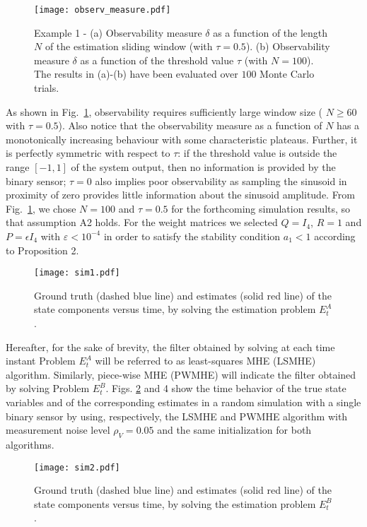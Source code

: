 \documentclass[11pt,journal,onecolumn]{IEEEtran}
\begin{document}
\begin{figure}[h!]
\centering
\texttt{[image: observ\_measure.pdf]}\caption{Example 1 - (a) Observability measure $\delta$ as a function of the length $N$ of the estimation sliding window (with $\tau = 0.5$). (b) Observability measure $\delta$ as a function of the threshold value $\tau$  (with $N = 100$). The results in (a)-(b) have been evaluated over $100$ Monte Carlo trials.}
\label{fig:observability_measure}
\end{figure}
As shown in Fig.~\ref{fig:observability_measure}, observability requires  sufficiently large window size ( $N \geq  60$ with $\tau = 0.5$).
Also notice that the observability measure as a function of $N$ has a monotonically increasing behaviour with some characteristic plateaus. Further, it is perfectly symmetric with respect to $\tau$: if the threshold value is outside the range $[-1,1]$ of the system output, then no information is provided by the binary sensor; $\tau = 0$ also implies poor observability as sampling the sinusoid in proximity of zero provides little information about the sinusoid amplitude. From Fig.~\ref{fig:observability_measure}, we chose $N = 100$ and $\tau = 0.5$ for the forthcoming simulation results, so that assumption A2 holds. For the weight matrices we selected $Q = I_{4}$, $R=1$ and $P = \epsilon I_4$ with $\varepsilon<10^{-4}$ in order to satisfy the stability condition $a_1 < 1$ according to Proposition 2.
\begin{figure}[h!]
\centering
\texttt{[image: sim1.pdf]}
\caption{Ground truth (dashed blue line) and estimates (solid red line) of the state components versus time, by solving the estimation problem $E_{t}^{A}$.}
\label{fig:sim1}
\end{figure}
Hereafter, for the sake of brevity, the filter obtained by solving at each time instant Problem $E_t^A$ will be referred to as least-squares MHE (LSMHE) algorithm. Similarly, piece-wise MHE (PWMHE) will indicate the filter obtained by solving Problem $E_t^B$. Figs. \ref{fig:sim1} and 4 show the time behavior of the true state variables and of the corresponding estimates in a random simulation with a single binary sensor
by using, respectively, the LSMHE and PWMHE algorithm with measurement noise level $\rho_V = 0.05$ and the same initialization for both algorithms.
\begin{figure}[h!]
\centering
\texttt{[image: sim2.pdf]}
\caption{Ground truth (dashed blue line) and estimates (solid red line) of the state components versus time, by solving the estimation problem $E_{t}^{B}$.}
\label{fig:sim2}
\end{figure}
\end{document}

